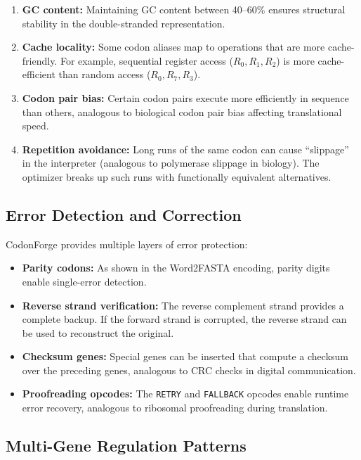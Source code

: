 \begin{enumerate}[leftmargin=1.8em]
  \item \textbf{GC content:} Maintaining GC content between 40--60\% ensures structural stability in the double-stranded representation.
  \item \textbf{Cache locality:} Some codon aliases map to operations that are more cache-friendly. For example, sequential register access ($R_0, R_1, R_2$) is more cache-efficient than random access ($R_0, R_7, R_3$).
  \item \textbf{Codon pair bias:} Certain codon pairs execute more efficiently in sequence than others, analogous to biological codon pair bias affecting translational speed.
  \item \textbf{Repetition avoidance:} Long runs of the same codon can cause ``slippage'' in the interpreter (analogous to polymerase slippage in biology). The optimizer breaks up such runs with functionally equivalent alternatives.
\end{enumerate}

\subsection{Error Detection and Correction}

CodonForge provides multiple layers of error protection:

\begin{itemize}[leftmargin=1.8em]
  \item \textbf{Parity codons:} As shown in the Word2FASTA encoding, parity digits enable single-error detection.
  \item \textbf{Reverse strand verification:} The reverse complement strand provides a complete backup. If the forward strand is corrupted, the reverse strand can be used to reconstruct the original.
  \item \textbf{Checksum genes:} Special genes can be inserted that compute a checksum over the preceding genes, analogous to CRC checks in digital communication.
  \item \textbf{Proofreading opcodes:} The \texttt{RETRY} and \texttt{FALLBACK} opcodes enable runtime error recovery, analogous to ribosomal proofreading during translation.
\end{itemize}

\subsection{Multi-Gene Regulation Patterns}


